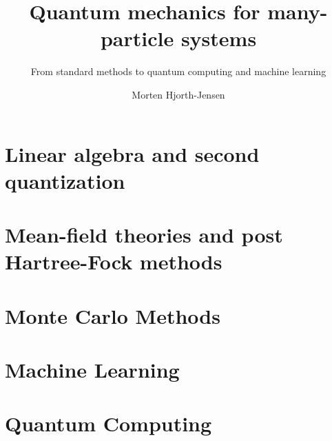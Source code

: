\documentclass[graybox,envcountchap,sectrefs]{svmono}
\begin{document}
\author{Morten Hjorth-Jensen}
\title{Quantum mechanics for many-particle systems}
\subtitle{From standard methods to quantum computing and machine learning}
\maketitle

\frontmatter%






\tableofcontents




\mainmatter%
 \part{Linear algebra and second quantization}
         
 \clearemptydoublepage
         
 \clearemptydoublepage
      
 \part{Mean-field theories and post Hartree-Fock methods}
\clearemptydoublepage
      
\clearemptydoublepage

\clearemptydoublepage

\part{Monte Carlo Methods}

 \clearemptydoublepage

 \clearemptydoublepage

 \clearemptydoublepage

 \clearemptydoublepage


\part{Machine Learning}

%
\part{Quantum Computing}   

 

\backmatter%
%
%
\printindex
\end{document}
